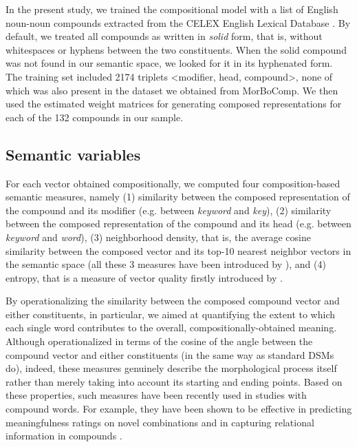 In the present study, we trained the compositional model with a list of English noun-noun compounds extracted from the CELEX English Lexical Database \citep{celex}. By default, we treated all compounds as written in \emph{solid} form, that is, without whitespaces or hyphens between the two constituents. When the solid compound was not found in our semantic space, we looked for it in its hyphenated form. The training set included 2174 triplets <modifier, head, compound>, none of which was also present in the dataset we obtained from MorBoComp. We then used the estimated weight matrices for generating composed representations for each of the 132 compounds in our sample.


\subsection{Semantic variables}

For each vector obtained compositionally, we computed four composition-based semantic measures, namely (1) similarity between the composed representation of the compound and its modifier (e.g. between \emph{keyword} and \emph{key}), (2) similarity between the composed representation of the compound and its head (e.g. between \emph{keyword} and \emph{word}), (3) neighborhood density, that is, the average cosine similarity between the composed vector and its top-10 nearest neighbor vectors in the semantic space (all these 3 measures have been introduced by \citealt{vecchi2011}), and (4) entropy, that is a measure of vector quality firstly introduced by \cite{lazaridoufish}.

By operationalizing the similarity between the composed compound vector and either constituents, in particular, we aimed at quantifying the extent to which each single word contributes to the overall, compositionally-obtained meaning. Although operationalized in terms of the cosine of the angle between the compound vector and either constituents (in the same way as standard DSMs do), indeed, these measures genuinely describe the morphological process itself rather than merely taking into account its starting and ending points. Based on these properties, such measures have been recently used in studies with compound words. For example, they have been shown to be effective in predicting meaningfulness ratings on novel combinations \citep{gunther2016} and in capturing relational information in compounds \citep{marelli2017}.

